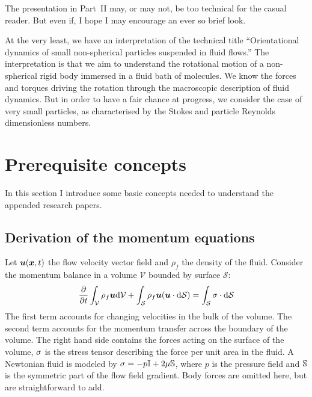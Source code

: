 \documentclass[thesis.tex]{subfiles}
\begin{document}
The presentation in Part~II may, or may not, be too technical for the casual reader. But even if, I hope I may encourage an ever so brief look.

At the very least, we have an interpretation of the technical title ``Orientational dynamics of small non-spherical particles suspended in fluid flows.'' The interpretation is that we aim to understand the rotational motion of a non-spherical rigid body immersed in a fluid bath of molecules. We know the forces and torques driving the rotation through the macroscopic description of fluid dynamics. But in order to have a fair chance at progress, we consider the case of very small particles, as characterised by the Stokes and particle Reynolds dimensionless numbers.


\chapter{Prerequisite concepts}\label{sec:prerequisites}


In this section I introduce some basic concepts needed to understand the appended research papers. 

\section{Derivation of the momentum equations}

Let $\mbox{\boldmath$u$}(\mbox{\boldmath$x$}, t)$ the flow velocity vector field and $\rho_f$ the density of the fluid. Consider the momentum balance in a volume $\mathcal V$ bounded by surface $\mathcal S$:
\begin{align}
    \frac{\partial }{\partial t}\int_\mathcal V  \rho_f \mbox{\boldmath$u$} \mathrm{d}\mathcal V +
    \int_\mathcal S \rho_f\mbox{\boldmath$u$} (\mbox{\boldmath$u$} \cdot \mathrm{d} \mathcal S) =
    \int_\mathcal S \mathbb{\sigma} \cdot \mathrm{d} \mathcal S
\end{align}
The first term accounts for changing velocities in the bulk of the volume. The second term accounts for the momentum transfer across the boundary of the volume. The right hand side contains the forces acting on the surface of the volume, $\mathbb{\sigma}$ is the stress tensor describing the force per unit area in the fluid. A Newtonian fluid is modeled by $\mathbb{\sigma} = -p \mathbb{I} + 2\mu \mathbb{S}$, where $p$ is the pressure field and $\mathbb{S}$ is the symmetric part of the flow field gradient. Body forces are omitted here, but are straightforward to add.
\end{document}
